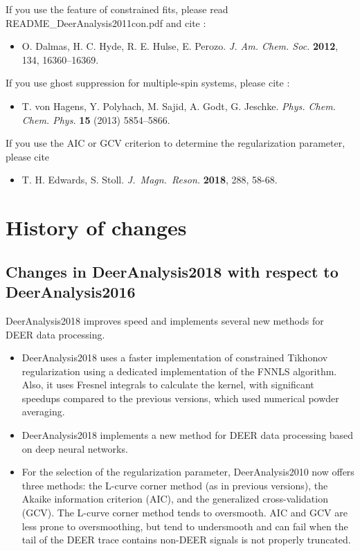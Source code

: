 \documentclass{article}
\begin{document}
If you use the feature of constrained fits, please read {\ttfamily README\_DeerAnalysis2011con.pdf} and cite \cite{dalmas2012}:
\begin{itemize}
 \item O. Dalmas, H. C. Hyde, R. E. Hulse, E. Perozo. \emph{J. Am. Chem. Soc.} {\bf 2012}, 134, 16360--16369.
\end{itemize}

If you use ghost suppression for multiple-spin systems, please cite \cite{vonHagens2013}:
\begin{itemize}
\item T. von Hagens, Y. Polyhach, M. Sajid, A. Godt, G. Jeschke.
{\em Phys. Chem. Chem. Phys.} {\bf 15} (2013) 5854--5866.
\end{itemize}

If you use the AIC or GCV criterion to determine the regularization parameter, please cite \cite{edwards2018}
\begin{itemize}
\item
T. H. Edwards, S. Stoll.
\emph{J.~Magn.~Reson.} {\bf 2018}, 288, 58-68.
\end{itemize}

\section{History of changes}
\subsection{Changes in DeerAnalysis2018 with respect to DeerAnalysis2016}
\label{changes_2018}

DeerAnalysis2018 improves speed and implements several new methods for DEER data processing.

\begin{itemize}
\item
DeerAnalysis2018 uses a faster implementation of constrained Tikhonov regularization using a dedicated implementation of the FNNLS algorithm. Also, it uses Fresnel integrals to calculate the kernel, with significant speedups compared to the previous versions, which used numerical powder averaging.
\item
DeerAnalysis2018 implements a new method for DEER data processing based on deep neural networks.
\item
For the selection of the regularization parameter, DeerAnalysis2010 now offers three methods: the L-curve corner method (as in previous versions), the Akaike information criterion (AIC), and the generalized cross-validation (GCV). The L-curve corner method tends to oversmooth. AIC and GCV are less prone to oversmoothing, but tend to undersmooth and can fail when the tail of the DEER trace contains non-DEER signals is not properly truncated.
\end{itemize}
\end{document}
